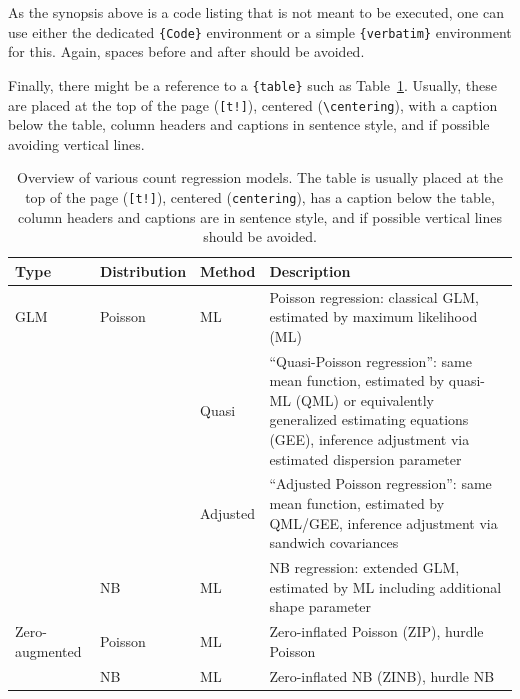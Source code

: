 \documentclass[article]{jss}
\begin{document}
\begin{leftbar}
As the synopsis above is a code listing that is not meant to be executed,
one can use either the dedicated \verb|{Code}| environment or a simple
\verb|{verbatim}| environment for this. Again, spaces before and after should be
avoided.

Finally, there might be a reference to a \verb|{table}| such as
Table~\ref{tab:overview}. Usually, these are placed at the top of the page
(\verb|[t!]|), centered (\verb|\centering|), with a caption below the table,
column headers and captions in sentence style, and if possible avoiding vertical
lines.
\end{leftbar}

\begin{table}[t!]
\centering
\begin{tabular}{lllp{7.4cm}}
\hline
Type           & Distribution & Method   & Description \\ \hline
GLM            & Poisson      & ML       & Poisson regression: classical GLM,
                                           estimated by maximum likelihood (ML) \\
               &              & Quasi    & ``Quasi-Poisson regression'':
                                           same mean function, estimated by
                                           quasi-ML (QML) or equivalently
                                           generalized estimating equations (GEE),
                                           inference adjustment via estimated
                                           dispersion parameter \\
               &              & Adjusted & ``Adjusted Poisson regression'':
                                           same mean function, estimated by
                                           QML/GEE, inference adjustment via
                                           sandwich covariances\\
               & NB           & ML       & NB regression: extended GLM,
                                           estimated by ML including additional
                                           shape parameter \\ \hline
Zero-augmented & Poisson      & ML       & Zero-inflated Poisson (ZIP),
                                           hurdle Poisson \\
               & NB           & ML       & Zero-inflated NB (ZINB),
                                           hurdle NB \\ \hline
\end{tabular}
\caption{\label{tab:overview} Overview of various count regression models. The
table is usually placed at the top of the page (\texttt{[t!]}), centered
(\texttt{centering}), has a caption below the table, column headers and captions
are in sentence style, and if possible vertical lines should be avoided.}
\end{table}
\end{document}
